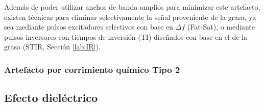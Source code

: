 Además de poder utilizar anchos de banda amplios para minimizar este artefacto, existen técnicas para eliminar selectivamente la señal proveniente de la grasa, ya sea mediante pulsos excitadores selectivos con base en $\Delta f$ (Fat-Sat), o mediante pulsos inversores con tiempos de inversión (TI) diseñados con base en el \Tone de la grasa (STIR, Sección \ref{lab:IR}).


\subsubsection{Artefacto por corrimiento químico Tipo 2}



\subsection{Efecto dieléctrico}


